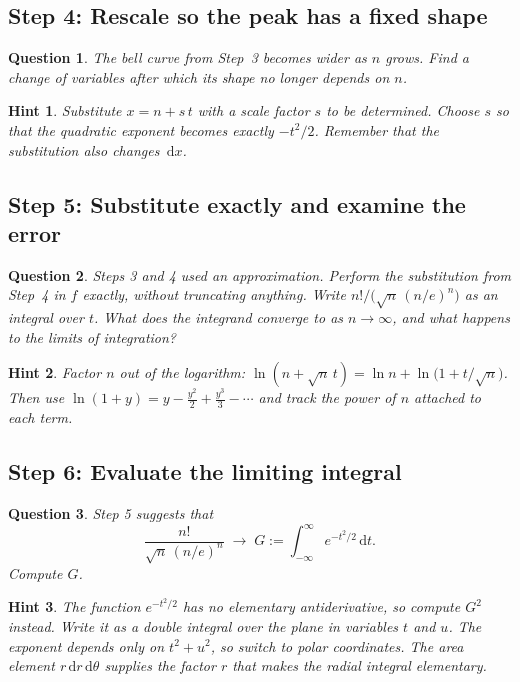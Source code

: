 \documentclass{workbook}
\theoremstyle{step}
\newtheorem*{question}{Question}
\newtheorem*{hint}{Hint}
\newcommand{\dd}{\,\mathrm{d}}
\begin{document}
\subsection*{Step 4: Rescale so the peak has a fixed shape}

\begin{question}
The bell curve from Step~3 becomes wider as $n$ grows. Find a change of
variables after which its shape no longer depends on $n$.
\end{question}

\begin{hint}
Substitute $x = n + s\,t$ with a scale factor $s$ to be determined. Choose $s$
so that the quadratic exponent becomes exactly $-t^2/2$. Remember that the
substitution also changes $\dd x$.
\end{hint}

\subsection*{Step 5: Substitute exactly and examine the error}

\begin{question}
Steps 3 and 4 used an approximation. Perform the substitution from Step~4 in
$f$ exactly, without truncating anything. Write
$n!/\bigl(\sqrt{n}\,(n/e)^n\bigr)$ as an integral over $t$. What does the
integrand converge to as $n\to\infty$, and what happens to the limits of
integration?
\end{question}

\begin{hint}
Factor $n$ out of the logarithm:
$\ln(n + \sqrt{n}\,t) = \ln n + \ln\bigl(1 + t/\sqrt{n}\bigr)$. Then use
$\ln(1+y) = y - \tfrac{y^2}{2} + \tfrac{y^3}{3} - \cdots$ and track the power
of $n$ attached to each term.
\end{hint}

\subsection*{Step 6: Evaluate the limiting integral}

\begin{question}
Step 5 suggests that
\[
  \frac{n!}{\sqrt{n}\,(n/e)^n} \;\longrightarrow\; G
  := \int_{-\infty}^{\infty} e^{-t^2/2}\dd t .
\]
Compute $G$.
\end{question}

\begin{hint}
The function $e^{-t^2/2}$ has no elementary antiderivative, so compute $G^2$
instead. Write it as a double integral over the plane in variables $t$ and
$u$. The exponent depends only on $t^2 + u^2$, so switch to polar
coordinates. The area element $r\dd r\dd\theta$ supplies the factor $r$ that
makes the radial integral elementary.
\end{hint}
\end{document}
